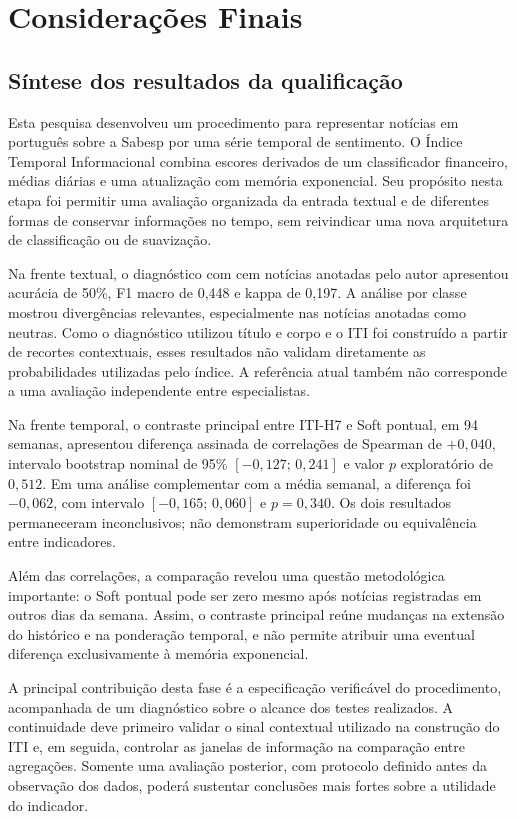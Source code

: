 \chapter{Considerações Finais}
\label{cap:consideracoes}

\section{Síntese dos resultados da qualificação}

Esta pesquisa desenvolveu um procedimento para representar notícias em português sobre a Sabesp por uma série temporal de sentimento. O Índice Temporal Informacional combina escores derivados de um classificador financeiro, médias diárias e uma atualização com memória exponencial. Seu propósito nesta etapa foi permitir uma avaliação organizada da entrada textual e de diferentes formas de conservar informações no tempo, sem reivindicar uma nova arquitetura de classificação ou de suavização.

Na frente textual, o diagnóstico com cem notícias anotadas pelo autor apresentou acurácia de 50\%, F1 macro de 0,448 e kappa de 0,197. A análise por classe mostrou divergências relevantes, especialmente nas notícias anotadas como neutras. Como o diagnóstico utilizou título e corpo e o ITI foi construído a partir de recortes contextuais, esses resultados não validam diretamente as probabilidades utilizadas pelo índice. A referência atual também não corresponde a uma avaliação independente entre especialistas.

Na frente temporal, o contraste principal entre ITI-H7 e Soft pontual, em 94 semanas, apresentou diferença assinada de correlações de Spearman de $+0{,}040$, intervalo bootstrap nominal de 95\% $[-0{,}127;\,0{,}241]$ e valor $p$ exploratório de $0{,}512$. Em uma análise complementar com a média semanal, a diferença foi $-0{,}062$, com intervalo $[-0{,}165;\,0{,}060]$ e $p=0{,}340$. Os dois resultados permaneceram inconclusivos; não demonstram superioridade ou equivalência entre indicadores.

Além das correlações, a comparação revelou uma questão metodológica importante: o Soft pontual pode ser zero mesmo após notícias registradas em outros dias da semana. Assim, o contraste principal reúne mudanças na extensão do histórico e na ponderação temporal, e não permite atribuir uma eventual diferença exclusivamente à memória exponencial.

A principal contribuição desta fase é a especificação verificável do procedimento, acompanhada de um diagnóstico sobre o alcance dos testes realizados. A continuidade deve primeiro validar o sinal contextual utilizado na construção do ITI e, em seguida, controlar as janelas de informação na comparação entre agregações. Somente uma avaliação posterior, com protocolo definido antes da observação dos dados, poderá sustentar conclusões mais fortes sobre a utilidade do indicador.

